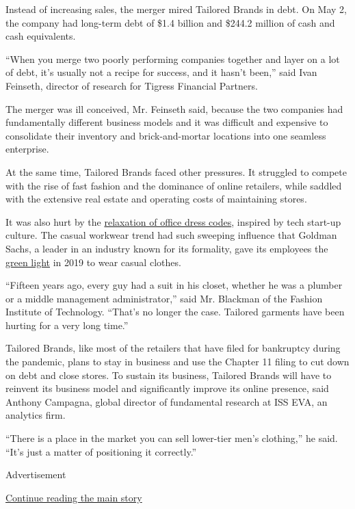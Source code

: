 Instead of increasing sales, the merger mired Tailored Brands in debt.
On May 2, the company had long-term debt of \$1.4 billion and \$244.2
million of cash and cash equivalents.

``When you merge two poorly performing companies together and layer on a
lot of debt, it's usually not a recipe for success, and it hasn't
been,'' said Ivan Feinseth, director of research for Tigress Financial
Partners.

The merger was ill conceived, Mr. Feinseth said, because the two
companies had fundamentally different business models and it was
difficult and expensive to consolidate their inventory and
brick-and-mortar locations into one seamless enterprise.

At the same time, Tailored Brands faced other pressures. It struggled to
compete with the rise of fast fashion and the dominance of online
retailers, while saddled with the extensive real estate and operating
costs of maintaining stores.

It was also hurt by the
\href{https://www.nytimes3xbfgragh.onion/2016/05/26/fashion/office-fashion-uniforms.html}{relaxation
of office dress codes}, inspired by tech start-up culture. The casual
workwear trend had such sweeping influence that Goldman Sachs, a leader
in an industry known for its formality, gave its employees the
\href{https://www.nytimes3xbfgragh.onion/2019/03/06/business/dealbook/goldman-sachs-dress-code.html}{green
light} in 2019 to wear casual clothes.

``Fifteen years ago, every guy had a suit in his closet, whether he was
a plumber or a middle management administrator,'' said Mr. Blackman of
the Fashion Institute of Technology. ``That's no longer the case.
Tailored garments have been hurting for a very long time.''

Tailored Brands, like most of the retailers that have filed for
bankruptcy during the pandemic, plans to stay in business and use the
Chapter 11 filing to cut down on debt and close stores. To sustain its
business, Tailored Brands will have to reinvent its business model and
significantly improve its online presence, said Anthony Campagna, global
director of fundamental research at ISS EVA, an analytics firm.

``There is a place in the market you can sell lower-tier men's
clothing,'' he said. ``It's just a matter of positioning it correctly.''

Advertisement

\protect\hyperlink{after-bottom}{Continue reading the main story}

